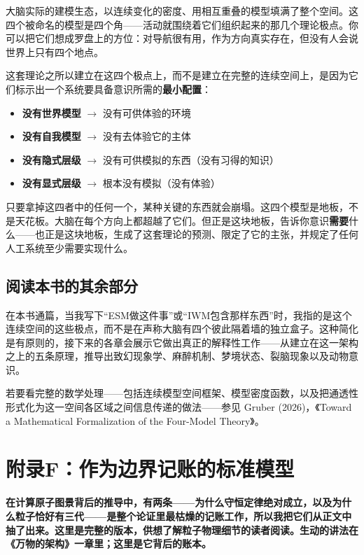 \documentclass[11pt, twoside, openright]{book}
\begin{document}
大脑实际的建模生态，以连续变化的密度、用相互重叠的模型填满了整个空间。这四个被命名的模型是四个角------活动就围绕着它们组织起来的那几个理论极点。你可以把它们想成罗盘上的方位：对导航很有用，作为方向真实存在，但没有人会说世界上只有四个地点。

这套理论之所以建立在这四个极点上，而不是建立在完整的连续空间上，是因为它们标示出一个系统要具备意识所需的\textbf{最小配置}：

\begin{itemize}
  \item \textbf{没有世界模型} $\rightarrow$ 没有可供体验的环境
  \item \textbf{没有自我模型} $\rightarrow$ 没有去体验它的主体
  \item \textbf{没有隐式层级} $\rightarrow$ 没有可供模拟的东西（没有习得的知识）
  \item \textbf{没有显式层级} $\rightarrow$ 根本没有模拟（没有体验）
\end{itemize}

只要拿掉这四者中的任何一个，某种关键的东西就会崩塌。这四个模型是地板，不是天花板。大脑在每个方向上都超越了它们。但正是这块地板，告诉你意识\textbf{需要}什么------也正是这块地板，生成了这套理论的预测、限定了它的主张，并规定了任何人工系统至少需要实现什么。

\section*{阅读本书的其余部分}

在本书通篇，当我写下“ESM做这件事”或“IWM包含那样东西”时，我指的是这个连续空间的这些极点，而不是在声称大脑有四个彼此隔着墙的独立盒子。这种简化是有原则的，接下来的各章会展示它做出真正的解释性工作------从建立在这一架构之上的五条原理，推导出致幻现象学、麻醉机制、梦境状态、裂脑现象以及动物意识。

若要看完整的数学处理------包括连续模型空间框架、模型密度函数，以及把通透性形式化为这一空间各区域之间信息传递的做法------参见 Gruber (2026)，《Toward a Mathematical Formalization of the Four-Model Theory》。


\chapter*{附录F：作为边界记账的标准模型}

\textbf{在计算原子图景背后的推导中，有两条------为什么守恒定律绝对成立，以及为什么粒子恰好有三代------是整个论证里最枯燥的记账工作，所以我把它们从正文中抽了出来。这里是完整的版本，供想了解粒子物理细节的读者阅读。生动的讲法在《万物的架构》一章里；这里是它背后的账本。}
\end{document}
